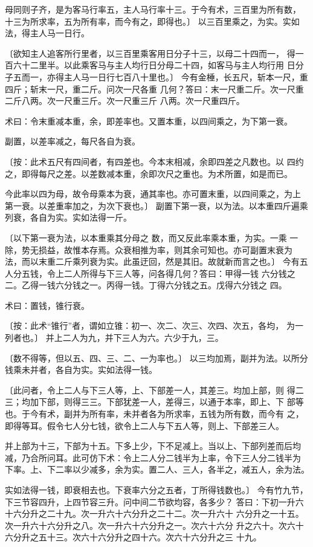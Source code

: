 \documentclass[12pt,UTF8]{ctexbook}
\begin{document}
母同则子齐，是为客马行率五，主人马行率十三。于今有术，三百里为所有数， 十三为所求率，五为所有率，而今有之，即得也。〕 以三百里乘之，为实。实如法，得主人马一日行。

〔欲知主人追客所行里者，以三百里乘客用日分子十三，以母二十四而一， 得一百六十二里半。以此乘客马与主人均行日分母二十四，如客马与主人均行用 日分子五而一，亦得主人马一日行七百八十里也。〕 今有金棰，长五尺，斩本一尺，重四斤；斩末一尺，重二斤。问次一尺各重 几何？答曰：末一尺重二斤。次一尺重二斤八两。次一尺重三斤。次一尺重三斤 八两。次一尺重四斤。

术曰：令末重减本重，余，即差率也。又置本重，以四间乘之，为下第一衰。

副置，以差率减之，每尺各自为衰。

〔按：此术五尺有四间者，有四差也。今本末相减，余即四差之凡数也。以 四约之，即得每尺之差。以差数减本重，余即次尺之重也。为术所置，如是而已。

今此率以四为母，故令母乘本为衰，通其率也。亦可置末重，以四间乘之，为上 第一衰。以差重率加之，为次下衰也。〕 副置下第一衰，以为法。以本重四斤遍乘列衰，各自为实。实如法得一斤。

〔以下第一衰为法，以本重乘其分母之 数，而又反此率乘本重，为实。一乘 一除，势无损益，故惟本存焉。众衰相推为率，则其余可知也。亦可副置末衰为 法，而以末重二斤乘列衰为实。此虽迂回，然是其旧。故就新而言之也。〕 今有五人分五钱，令上二人所得与下三人等，问各得几何？答曰：甲得一钱 六分钱之二。乙得一钱六分钱之一。丙得一钱。丁得六分钱之五。戊得六分钱之 四。

术曰：置钱，锥行衰。

〔按：此术“锥行”者，谓如立锥：初一、次二、次三、次四、次五，各均， 为一列者也。〕 并上二人为九，并下三人为六。六少于九，三。

〔数不得等，但以五、四、三、二、一为率也。〕 以三均加焉，副并为法。以所分钱乘未并者，各自为实。实如法得一钱。

〔此问者，令上二人与下三人等，上、下部差一人，其差三。均加上部，则 得二三；均加下部，则得三三。下部犹差一人，差得三，以通于本率，即上、下 部等也。于今有术，副并为所有率，未并者各为所求率，五钱为所有数，而今有 之，即得等耳。假令七人分七钱，欲令上二人与下五人等，则上、下部差三人。

并上部为十三，下部为十五。下多上少，下不足减上。当以上、下部列差而后均 减，乃合所问耳。此可仿下术：令上二人分二钱半为上率，令下三人分二钱半为 下率。上、下二率以少减多，余为实。置二人、三人，各半之，减五人，余为法。

实如法得一钱，即衰相去也。下衰率六分之五者，丁所得钱数也。〕 今有竹九节，下三节容四升，上四节容三升。问中间二节欲均容，各多少？ 答曰：下初一升六十六分升之二十九。次一升六十六分升之二十二。次一升六十 六分升之一十五。次一升六十六分升之八。次一升六十六分升之一。次六十六分 升之六十。次六十六分升之五十三。次六十六分升之四十六。次六十六分升之三 十九。
\end{document}
